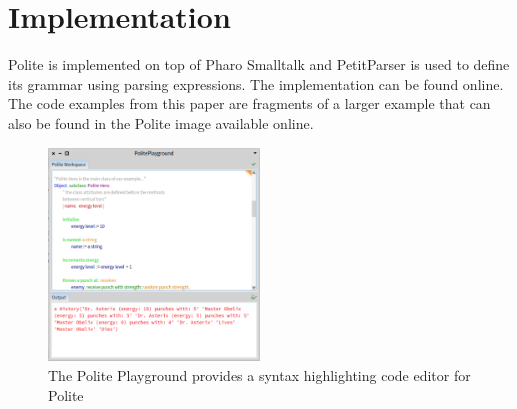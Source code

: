 
\section{Implementation}
Polite is implemented on top of Pharo Smalltalk and PetitParser is used to define its grammar using parsing expressions. The implementation can be found online. The code examples from this paper are fragments of a larger example that can also be found in the Polite image available online. 

\begin{figure}[h]
	\centering
	\includegraphics[width=0.5\textwidth]{images/playground.png}
	\caption{The Polite Playground provides a syntax highlighting code editor for Polite}
	\label{fig:figure1}
\end{figure}